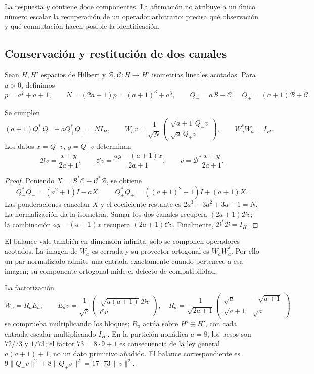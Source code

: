 La respuesta \(y\) contiene doce componentes. La afirmación no atribuye
a un único número escalar la recuperación de un operador arbitrario:
precisa qué observación y qué conmutación hacen posible la identificación.

\subsection{Conservación y restitución de dos canales}
\label{v:subsec:acoplamiento-bilateral}

Sean \(H,H'\) espacios de Hilbert y
\(\mathcal B,\mathcal C:H\to H'\) isometrías lineales acotadas.
Para \(a>0\), definimos
\[
 p=a^2+a+1,\qquad N=(2a+1)p=(a+1)^3+a^3,\qquad
 Q_-=a\mathcal B-\mathcal C,\quad Q_+=(a+1)\mathcal B+\mathcal C.
\]

\begin{theorem}
\label{v:thm:acoplamiento-balance}
Se cumplen
\[
 (a+1)Q_-^*Q_-+aQ_+^*Q_+=NI_H,\qquad
 W_av=\frac1{\sqrt N}
 \begin{pmatrix}\sqrt{a+1}\,Q_-v\\\sqrt a\,Q_+v\end{pmatrix},
 \qquad W_a^*W_a=I_H.
\]
Los datos \(x=Q_-v\), \(y=Q_+v\) determinan
\[
 \mathcal Bv=\frac{x+y}{2a+1},\qquad
 \mathcal Cv=\frac{ay-(a+1)x}{2a+1},\qquad
 v=\mathcal B^*\frac{x+y}{2a+1}.
\]
\end{theorem}
\begin{proof}
Poniendo \(X=\mathcal B^*\mathcal C+\mathcal C^*\mathcal B\), se obtiene
\[
 Q_-^*Q_-=(a^2+1)I-aX,\qquad
 Q_+^*Q_+=((a+1)^2+1)I+(a+1)X.
\]
Las ponderaciones cancelan \(X\) y el coeficiente restante es
\(2a^3+3a^2+3a+1=N\). La normalización da la isometría.
Sumar los dos canales recupera \((2a+1)\mathcal Bv\);
la combinación \(ay-(a+1)x\) recupera \((2a+1)\mathcal Cv\).
Finalmente, \(\mathcal B^*\mathcal B=I_H\).
\end{proof}

El balance vale también en dimensión infinita: sólo se componen
operadores acotados. La imagen de \(W_a\) es cerrada y su proyector
ortogonal es \(W_aW_a^*\). Por ello un par normalizado admite una
entrada exactamente cuando pertenece a esa imagen; su componente
ortogonal mide el defecto de compatibilidad.

La factorización
\[
 W_a=R_aE_a,\qquad
 E_av=\frac1{\sqrt p}
 \begin{pmatrix}\sqrt{a(a+1)}\,\mathcal Bv\\\mathcal Cv\end{pmatrix},
 \quad
 R_a=\frac1{\sqrt{2a+1}}
 \begin{pmatrix}\sqrt a&-\sqrt{a+1}\\
 \sqrt{a+1}&\sqrt a\end{pmatrix}
\]
se comprueba multiplicando los bloques; \(R_a\) actúa sobre
\(H'\oplus H'\), con cada entrada escalar multiplicando \(I_{H'}\).
En la partición nonádica
\(a=8\), los pesos son \(72/73\) y \(1/73\); el factor
\(73=8\cdot9+1\) es consecuencia de la ley general
\(a(a+1)+1\), no un dato primitivo añadido. El balance correspondiente es
\(9\|Q_-v\|^2+8\|Q_+v\|^2=17\cdot73\,\|v\|^2\).

